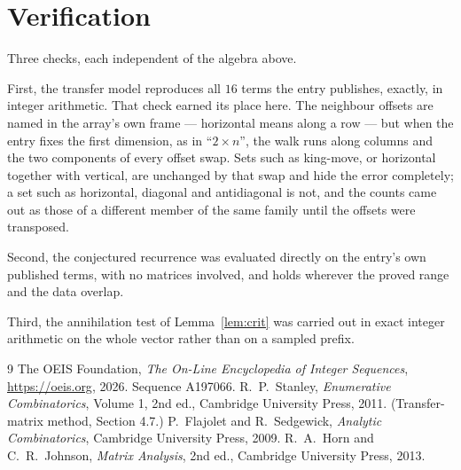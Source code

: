 \documentclass[11pt,a4paper]{article}
\theoremstyle{plain}
\theoremstyle{definition}
\begin{document}
\section{Verification}

Three checks, each independent of the algebra above.

First, the transfer model reproduces all $16$ terms the entry publishes, exactly, in
integer arithmetic. That check earned its place here. The neighbour offsets are named in the
array's own frame --- horizontal means along a row --- but when the entry fixes the first
dimension, as in ``$2\times n$'', the walk runs along columns and the two components of every
offset swap. Sets such as king-move, or horizontal together with vertical, are unchanged by
that swap and hide the error completely; a set such as horizontal, diagonal and antidiagonal
is not, and the counts came out as those of a different member of the same family until the
offsets were transposed.

Second, the conjectured recurrence was evaluated directly on the entry's own published terms,
with no matrices involved, and holds wherever the proved range and the data overlap.

Third, the annihilation test of Lemma~\ref{lem:crit} was carried out in exact integer
arithmetic on the whole vector rather than on a sampled prefix.

\begin{thebibliography}{9}
 The OEIS Foundation, \emph{The On-Line Encyclopedia of Integer
Sequences}, \url{https://oeis.org}, 2026. Sequence A197066.
 R.~P.~Stanley, \emph{Enumerative Combinatorics}, Volume 1, 2nd ed.,
Cambridge University Press, 2011. (Transfer-matrix method, Section 4.7.)
 P.~Flajolet and R.~Sedgewick, \emph{Analytic Combinatorics}, Cambridge
University Press, 2009.
 R.~A.~Horn and C.~R.~Johnson, \emph{Matrix Analysis}, 2nd ed., Cambridge
University Press, 2013.
\end{thebibliography}
\end{document}
